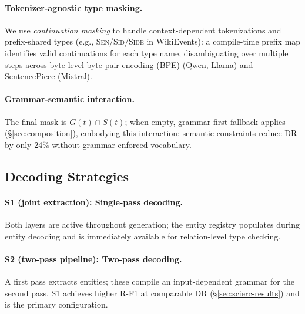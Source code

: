 \paragraph{Tokenizer-agnostic type masking.}
We use \emph{continuation masking} to handle context-dependent tokenizations and prefix-shared types (e.g., \textsc{Sen}/\textsc{Sid}/\textsc{Side} in WikiEvents): a compile-time prefix map identifies valid continuations for each type name, disambiguating over multiple steps across byte-level byte pair encoding (BPE) (Qwen, Llama) and SentencePiece (Mistral).

\paragraph{Grammar-semantic interaction.}
\label{sec:interaction}
The final mask is $G(t) \cap S(t)$; when empty, grammar-first fallback applies (\S\ref{sec:composition}), embodying this interaction: semantic constraints reduce DR by only 24\% without grammar-enforced vocabulary.


\subsection{Decoding Strategies}
\label{sec:strategies}

\paragraph{S1 (joint extraction): Single-pass decoding.}
Both layers are active throughout generation; the entity registry populates during entity decoding and is immediately available for relation-level type checking.

\paragraph{S2 (two-pass pipeline): Two-pass decoding.}\label{sec:s2}
A first pass extracts entities; these compile an input-dependent grammar for the second pass.
S1 achieves higher R-F1 at comparable DR (\S\ref{sec:scierc-results}) and is the primary configuration.
